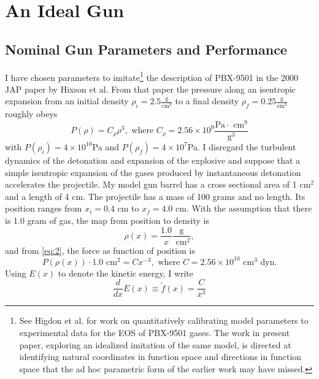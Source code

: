 \documentclass[]{article}
\newcommand{\nomf}{\tilde f} \newcommand{\COST}{\cal C}
\begin{document}
\section{An Ideal Gun}
\label{sec:an-ideal-gun}

\subsection{Nominal Gun Parameters and Performance}
\label{sec:Parameters}

I have chosen parameters to imitate\footnote{See Higdon et
  al.\cite{higdon2008computer} for work on quantitatively calibrating
  model parameters to experimental data for the EOS of PBX-9501
  gases.  The work in present paper, exploring an idealized imitation
  of the same model, is directed at identifying natural coordinates
  in function space and directions in function space that the ad hoc
  parametric form of the earlier work may have missed.}  the
description of PBX-9501 in the 2000 JAP paper by Hixson et
al\cite{Hixson2000}.  From that paper the pressure along an isentropic
expansion from an initial density $\rho_i = 2.5 \frac{\text{g}}{\text{
    cm}^3}$ to a final density $\rho_f = 0.25 \frac{\text{g}}{\text{
    cm}^3}$ roughly obeys
\begin{equation}
  \label{eq:2}
  P(\rho) = C_\rho \rho^3,\text{ where } C_\rho = 2.56\times 10^9
  \frac{\text{Pa}\cdot\text{ cm}^9}{\text{g}^3}
\end{equation}
with $P(\rho_i) = 4\times 10^{10}$Pa and $P(\rho_f) = 4\times 10^7$Pa.
I disregard the turbulent dynamics of the detonation and expansion of
the explosive and suppose that a simple isentropic expansion of the
gases produced by instantaneous detonation accelerates the projectile.
My model gun barrel has a cross sectional area of 1 cm$^2$ and a
length of 4 cm.  The projectile has a mass of 100 grams and no length.
Its position ranges from $x_i=0.4$ cm to $x_f=4.0$ cm.  With the
assumption that there is 1.0 gram of gas, the map from position to
density is
\begin{equation*}
  \rho(x) = \frac{1.0}{x} \frac{\text{g}}{\text{ cm}^2},
\end{equation*}
and from \eqref{eq:2}, the force as function of position is
\begin{equation*}
  P(\rho(x)) \cdot 1.0 \text{ cm}^2 = C x^{-3},\text{ where } C
  = 2.56 \times 10^{10}\text{ cm}^3 \text{ dyn}.
\end{equation*}
Using $E(x)$ to denote the kinetic energy, I write
\begin{equation}
  \label{eq:nom}
  \frac{d}{dx} E(x) \equiv \nomf(x) = \frac{C}{x^3}
\end{equation}
\end{document}
